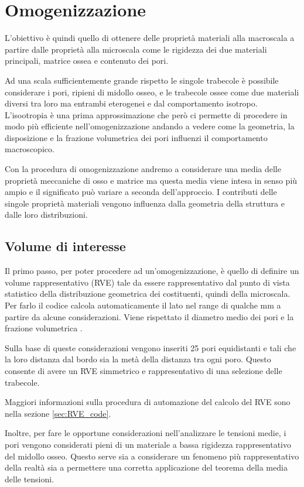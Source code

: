 \documentclass[a4paper,num-refs]{oup-contemporary}
\begin{document}
\section{Omogenizzazione}

L'obiettivo è quindi quello di ottenere delle proprietà materiali alla macroscala a partire dalle proprietà alla microscala come le rigidezza dei due  materiali principali, matrice ossea e contenuto dei pori. 

Ad una scala sufficientemente grande rispetto le singole trabecole è possibile considerare i pori, ripieni di midollo osseo, e le trabecole ossee come due materiali diversi tra loro ma entrambi eterogenei e dal comportamento isotropo. L'isootropia è una prima approssimazione che però ci permette di procedere in modo più efficiente nell'omogenizzazione andando a vedere come la geometria, la disposizione e la frazione volumetrica dei pori influenzi il comportamento macroscopico. 

Con la procedura di omogenizzazione andremo a considerare una media delle proprietà meccaniche di osso e matrice ma questa media viene intesa in senso più ampio e il significato può variare a seconda dell'approccio. I contributi delle singole proprietà materiali vengono influenza dalla geometria della struttura e dalle loro distribuzioni. 

\subsection{Volume di interesse}
\label{sec:RVE}

Il primo passo, per poter procedere ad un'omogenizzazione, è quello di definire un volume rappresentativo (RVE) tale da essere rappresentativo dal punto di vista statistico della distribuzione geometrica dei costituenti, quindi della microscala. Per farlo il codice calcola automaticamente il lato nel range di qualche mm a partire da alcune considerazioni. Viene rispettato il diametro medio dei pori \citep{Doktor:2011} e la frazione volumetrica  \citep{Cowin1}. 

Sulla base di queste considerazioni vengono inseriti 25 pori equidistanti e tali che la loro distanza dal bordo sia la metà della distanza tra ogni poro. Questo consente di avere un RVE simmetrico e rappresentativo di una selezione delle trabecole. 

Maggiori informazioni sulla procedura di automazione del calcolo del RVE sono nella sezione \ref{sec:RVE_code}.

Inoltre, per fare le opportune considerazioni nell'analizzare le tensioni medie, i pori vengono considerati pieni di un materiale a bassa rigidezza rappresentativo del midollo osseo. Questo serve sia a considerare un fenomeno più rappresentativo della realtà sia a permettere una corretta applicazione del teorema della media delle tensioni. 
\end{document}

